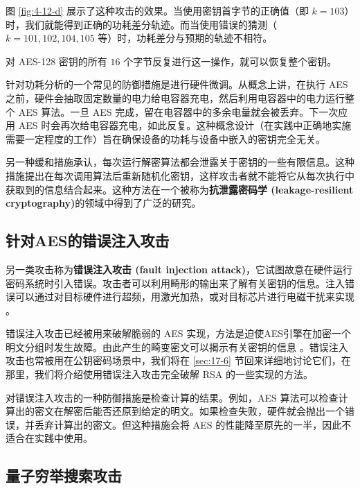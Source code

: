 \begin{snote}[差分功耗分析。]
\vspace*{10pt}

\noindent
图 \ref{fig:4-12-d} 展示了这种攻击的效果。当使用密钥首字节的正确值（即 $k=103$）时，我们就能得到正确的功耗差分轨迹。而当使用错误的猜测（$k=101,102,104,105$ 等）时，功耗差分与预期的轨迹不相符。

对 AES-128 密钥的所有 $16$ 个字节反复进行这一操作，就可以恢复整个密钥。
\end{snote}

\begin{snote}[缓和措施。]
针对功耗分析的一个常见的防御措施是进行硬件微调。从概念上讲，在执行 AES 之前，硬件会抽取固定数量的电力给电容器充电，然后利用电容器中的电力运行整个 AES 算法。一旦 AES 完成，留在电容器中的多余电量就会被丢弃。下一次应用 AES 时会再次给电容器充电，如此反复。这种概念设计（在实践中正确地实施需要一定程度的工作）旨在确保设备的功耗与设备中嵌入的密钥完全无关。

另一种缓和措施承认，每次运行解密算法都会泄露关于密钥的一些有限信息。这种措施提出在每次调用算法后重新随机化密钥，这样攻击者就不能将它从每次执行中获取到的信息结合起来。这种方法在一个被称为\textbf{抗泄露密码学 (leakage-resilient cryptography)}的领域中得到了广泛的研究。
\end{snote}

\subsection{针对AES的错误注入攻击}\label{subsec:4-3-3}

另一类攻击称为\textbf{错误注入攻击 (fault injection attack)}，它试图故意在硬件运行密码系统时引入错误。攻击者可以利用畸形的输出来了解有关密钥的信息。注入错误可以通过对目标硬件进行超频，用激光加热，或对目标芯片进行电磁干扰来实现 \cite{joye2012fault}。

错误注入攻击已经被用来破解脆弱的 AES 实现，方法是迫使AES引擎在加密一个明文分组时发生故障。由此产生的畸变密文可以揭示有关密钥的信息 \cite{joye2012fault}。错误注入攻击也常被用在公钥密码场景中，我们将在 \ref{sec:17-6} 节回来详细地讨论它们，在那里，我们将介绍使用错误注入攻击完全破解 RSA 的一些实现的方法。

对错误注入攻击的一种防御措施是检查计算的结果。例如，AES 算法可以检查计算出的密文在解密后能否还原到给定的明文。如果检查失败，硬件就会抛出一个错误，并丢弃计算出的密文。但这种措施会将 AES 的性能降至原先的一半，因此不适合在实践中使用。

\subsection{量子穷举搜索攻击}\label{subsec:4-3-4}

